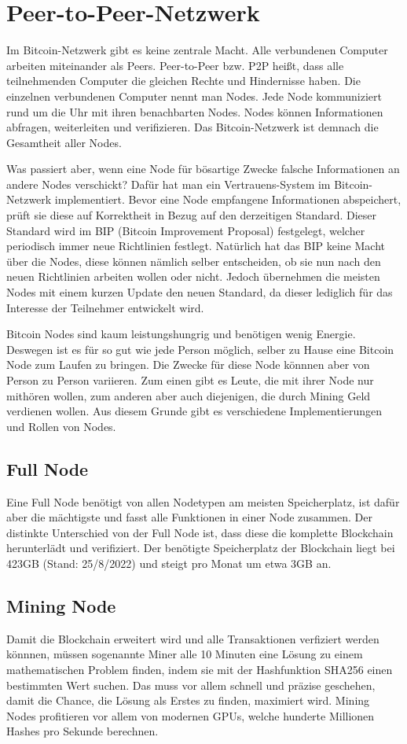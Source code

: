 \section{Peer-to-Peer-Netzwerk}
Im Bitcoin-Netzwerk gibt es keine zentrale Macht. Alle verbundenen Computer arbeiten miteinander als Peers. Peer-to-Peer
bzw. P2P heißt, dass alle teilnehmenden Computer die gleichen Rechte und Hindernisse haben. Die einzelnen verbundenen Computer
nennt man Nodes. Jede Node kommuniziert rund um die Uhr mit ihren benachbarten Nodes. Nodes können Informationen abfragen, 
weiterleiten und verifizieren. Das Bitcoin-Netzwerk ist demnach die Gesamtheit aller Nodes.

Was passiert aber, wenn eine Node für bösartige Zwecke falsche Informationen an andere Nodes verschickt? Dafür hat man ein
Vertrauens-System im Bitcoin-Netzwerk implementiert. Bevor eine Node empfangene Informationen abspeichert, prüft sie diese
auf Korrektheit in Bezug auf den derzeitigen Standard. Dieser Standard wird im BIP (Bitcoin Improvement Proposal) festgelegt,
welcher periodisch immer neue Richtlinien festlegt. Natürlich hat das BIP keine Macht über die Nodes, diese können nämlich
selber entscheiden, ob sie nun nach den neuen Richtlinien arbeiten wollen oder nicht. Jedoch übernehmen die meisten Nodes mit
einem kurzen Update den neuen Standard, da dieser lediglich für das Interesse der Teilnehmer entwickelt wird.

Bitcoin Nodes sind kaum leistungshungrig und benötigen wenig Energie. Deswegen ist es für so gut wie jede Person möglich,
selber zu Hause eine Bitcoin Node zum Laufen zu bringen. Die Zwecke für diese Node könnnen aber von Person zu Person variieren.
Zum einen gibt es Leute, die mit ihrer Node nur mithören wollen, zum anderen aber auch diejenigen, die durch Mining Geld
verdienen wollen. Aus diesem Grunde gibt es verschiedene Implementierungen und Rollen von Nodes.

\subsection{Full Node}
Eine Full Node benötigt von allen Nodetypen am meisten Speicherplatz, ist dafür aber die mächtigste und fasst alle Funktionen in 
einer Node zusammen. Der distinkte Unterschied von der Full Node ist, dass diese die komplette Blockchain herunterlädt und
verifiziert. Der benötigte Speicherplatz der Blockchain liegt bei 423GB (Stand: 25/8/2022) und steigt pro Monat um etwa 3GB an.

\subsection{Mining Node}
Damit die Blockchain erweitert wird und alle Transaktionen verfiziert werden könnnen, müssen sogenannte Miner alle 10 Minuten
eine Lösung zu einem mathematischen Problem finden, indem sie mit der Hashfunktion SHA256 einen bestimmten Wert suchen. Das muss
vor allem schnell und präzise geschehen, damit die Chance, die Lösung als Erstes zu finden, maximiert wird. Mining Nodes 
profitieren vor allem von modernen GPUs, welche hunderte Millionen Hashes pro Sekunde berechnen.

